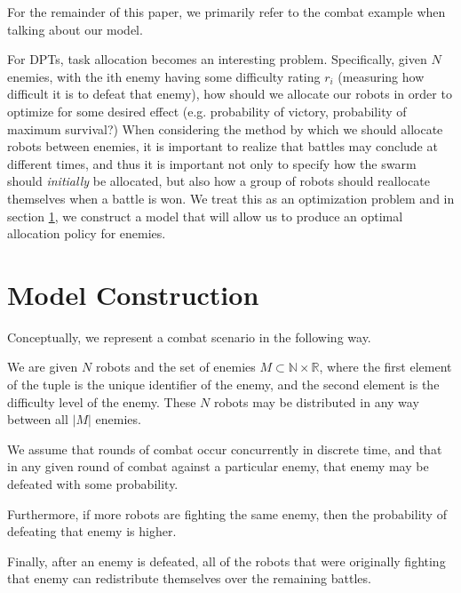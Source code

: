 \documentclass[11pt]{article}
\theoremstyle{definition}
\newcommand{\abs}[1]{\left\vert{#1}\right\vert}
\begin{document}
For the remainder of this paper, we primarily
refer to the combat example when talking about
our model.

For DPTs, task allocation becomes an interesting
problem.
Specifically, given $ N $ enemies,
with the ith enemy having some difficulty
rating $ r_i $ (measuring how difficult it is
to defeat that enemy), how should we allocate our robots
in order to optimize for some desired effect
(e.g. probability of victory, probability of maximum
survival?)
When considering the method by which we should allocate
robots between enemies, it is important to realize
that battles may conclude at different times, and
thus it is important not only to specify how the
swarm should \emph{initially} be allocated,
but also how a group of robots should reallocate
themselves when a battle is won. We treat this
as an optimization problem and in section
\ref{sec:model}, we construct a model that
will allow us to produce an optimal allocation
policy for enemies.

\section{Model Construction}
\label{sec:model}

Conceptually, we represent a combat scenario in the following way.

We are given $ N $ robots and the set of enemies
$ M \subset \mathbb{N} \times \mathbb{R} $,
where the first element of the tuple is the unique identifier
of the enemy, and the second element is the difficulty level
of the enemy. These $ N $ robots may be distributed
in any way between all $ \abs{M} $ enemies.

We assume that rounds of combat occur concurrently in discrete time,
and that in any given round of combat against a
particular enemy, that enemy may be defeated
with some probability.

Furthermore, if more robots are fighting
the same enemy, then the probability of
defeating that enemy is higher.

Finally, after an enemy is defeated, all of
the robots that were originally fighting
that enemy can redistribute themselves
over the remaining battles.
\end{document}
